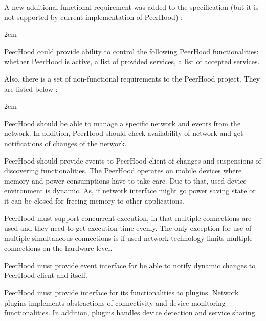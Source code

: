%
A new additional functional requirement was added to the specification (but it is not supported by current implementation of PeerHood) : 
\begin{description}
	\leftskip2em%
	\setlength{\itemsep}{0pt}%
	\setlength{\parsep}{0pt}%
	
	\item[User control] PeerHood could provide ability to control the following PeerHood functionalities: whether PeerHood is active, a list of provided services, a list of accepted services.
\end{description}

%
Also, there is a set of non-functional requirements to the PeerHood project. 
%
They are listed below : 
\begin{description}
	\leftskip2em%
	\setlength{\itemsep}{0pt}%
	\setlength{\parsep}{0pt}%
	
	\item[Network management] PeerHood should be able to manage a specific network and events from the network. 
	In addition, PeerHood should check availability of network and get notifications of changes of the network.

	\item[Component management] PeerHood should provide events to PeerHood client of changes and suspensions of discovering functionalities. 
	The PeerHood operates on mobile devices where memory and power consumptions have to take care. 
	Due to that, used device environment is dynamic. 
	As, if network interface might go power saving state or it can be closed for freeing memory to other applications.

	\item[Communication concurrency base] PeerHood must support concurrent execution, in that multiple connections are used and they need to get execution time evenly. 
	The only exception for use of multiple simultaneous connections is if used network technology limits multiple connections on the hardware level.

	\item[Event interface] PeerHood must provide event interface for be able to notify dynamic changes to PeerHood client and itself.

	\item[Plugin architecture for networks] PeerHood must provide interface for its functionalities to plugins. 
	Network plugins implements abstractions of connectivity and device monitoring functionalities. 
	In addition, plugins handles device detection and service sharing.
\end{description}

